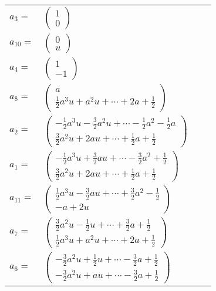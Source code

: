 \documentclass[1p]{elsarticle_modified}
\theoremstyle{definition}
\begin{document}
\begin{tabular}{m{7pt} m{180pt} m{7pt} m{180pt} }
\flushright $a_{3}=$&$\begin{pmatrix}1\\0\end{pmatrix}$ \\
\flushright $a_{10}=$&$\begin{pmatrix}0\\u\end{pmatrix}$ \\
\flushright $a_{4}=$&$\begin{pmatrix}1\\-1\end{pmatrix}$ \\
\flushright $a_{8}=$&$\begin{pmatrix}a\\\frac{1}{2} a^3 u+a^2 u+\cdots+2 a+\frac{1}{2}\end{pmatrix}$ \\
\flushright $a_{2}=$&$\begin{pmatrix}-\frac{1}{2} a^3 u-\frac{3}{2} a^2 u+\cdots-\frac{1}{2} a^2-\frac{1}{2} a\\\frac{3}{2} a^2 u+2 a u+\cdots+\frac{1}{2} a+\frac{1}{2}\end{pmatrix}$ \\
\flushright $a_{1}=$&$\begin{pmatrix}-\frac{1}{2} a^3 u+\frac{3}{2} a u+\cdots-\frac{3}{2} a^2+\frac{1}{2}\\\frac{3}{2} a^2 u+2 a u+\cdots+\frac{1}{2} a+\frac{1}{2}\end{pmatrix}$ \\
\flushright $a_{11}=$&$\begin{pmatrix}\frac{1}{2} a^3 u-\frac{3}{2} a u+\cdots+\frac{3}{2} a^2-\frac{1}{2}\\- a+2 u\end{pmatrix}$ \\
\flushright $a_{7}=$&$\begin{pmatrix}\frac{3}{2} a^2 u-\frac{1}{2} u+\cdots+\frac{3}{2} a+\frac{1}{2}\\\frac{1}{2} a^3 u+a^2 u+\cdots+2 a+\frac{1}{2}\end{pmatrix}$ \\
\flushright $a_{6}=$&$\begin{pmatrix}-\frac{3}{2} a^2 u+\frac{1}{2} u+\cdots-\frac{3}{2} a+\frac{1}{2}\\-\frac{3}{2} a^2 u+a u+\cdots-\frac{3}{2} a+\frac{1}{2}\end{pmatrix}$ \\

\end{tabular}
\end{document}
